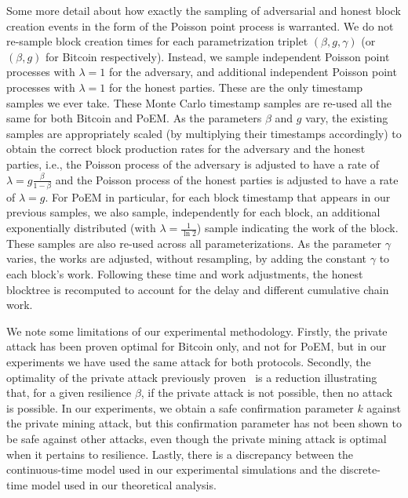 Some more detail about how exactly the sampling of adversarial and honest block creation events in the form of the
Poisson point process is warranted. We do not re-sample block creation times for each parametrization triplet
$(\beta, g, \gamma)$ (or $(\beta, g)$ for Bitcoin respectively). Instead, we sample \montecarlo{} independent
Poisson point processes with $\lambda = 1$ for the adversary, and \montecarlo{} additional independent Poisson point processes
with $\lambda = 1$ for the honest parties. These are the only timestamp samples we ever take. These Monte Carlo timestamp
samples are re-used all the same for both Bitcoin and PoEM. As the parameters $\beta$ and $g$ vary, the existing
samples are appropriately scaled (by multiplying their timestamps accordingly) to obtain the correct block
production rates for the adversary and the honest parties,
i.e., the Poisson process of the adversary is adjusted to have a rate of $\lambda = g\frac{\beta}{1 - \beta}$ and the
Poisson process of the honest parties is adjusted to have a rate of $\lambda = g$.
For PoEM in particular, for each block timestamp that appears in our previous samples, we also sample, independently for each block, an additional exponentially distributed (with $\lambda = \frac{1}{\ln2}$) sample indicating the work of the block.
These samples are also re-used across all parameterizations. As the parameter $\gamma$
varies, the works are adjusted, without resampling, by adding the constant $\gamma$ to each block's work.
Following these time and work adjustments, the honest blocktree is recomputed to account for the delay and
different cumulative chain work.

We note some limitations of our experimental methodology. Firstly, the private attack has been proven optimal
for Bitcoin only, and not for PoEM, but in our experiments we have used the same attack for both protocols.
Secondly, the optimality of the private attack previously proven~\cite{eiar} is a reduction illustrating
that, for a given resilience $\beta$, if the private attack is not possible, then no attack is possible.
In our experiments, we obtain a safe confirmation parameter $k$ against the private mining attack,
but this confirmation parameter has not been shown to be safe against other attacks, even though the private
mining attack is optimal when it pertains to resilience.
Lastly, there is a discrepancy between the continuous-time model used in our experimental simulations
and the discrete-time model used in our theoretical analysis.

